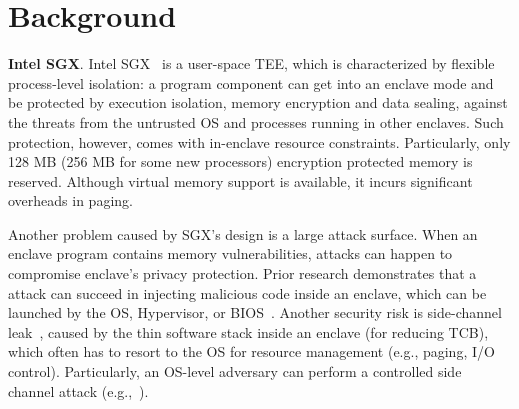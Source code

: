 \section{Background}\label{sec-background}

\noindent\textbf{Intel SGX}. Intel SGX~\cite{mckeen2013innovative} is a user-space TEE, which is characterized by flexible process-level isolation: a program component can get into an enclave mode and be protected by execution isolation, memory encryption and data sealing, against the threats from the untrusted OS and processes running in other enclaves. Such protection, however, comes with in-enclave resource constraints. Particularly, only 128 MB (256 MB for some new processors) encryption protected memory is reserved. Although \DIFdelbegin {}\DIFdelend virtual memory support is available, it incurs significant overheads in paging\DIFaddbegin {}\DIFaddend . 


Another problem caused by SGX's \DIFdelbegin {}\DIFdelend design is a large attack surface. \DIFaddbegin {}\DIFaddend When an enclave program contains memory vulnerabilities, attacks can happen to compromise enclave's privacy protection. Prior research demonstrates that a \DIFdelbegin {}\DIFdelend \DIFaddbegin {}\DIFaddend attack can succeed in injecting malicious code inside an enclave, which can be launched by the OS, Hypervisor, or BIOS~\cite{lee2017hacking,biondo2018guard,schwarz2019practical}. %
Another security risk is side-channel leak~\cite{schwarz2017malware,lee2017inferring,gras2018translation}, caused by the thin software stack inside an enclave (for reducing TCB),  which often has to resort to the OS for resource management (e.g., paging, I/O control). Particularly, an OS-level adversary can perform a controlled side channel attack (e.g.,~\cite{xu2015controlled}).

